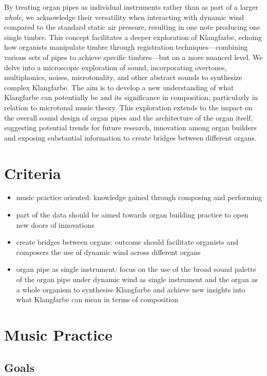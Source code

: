 By treating organ pipes as individual instruments rather than as part of a larger \textit{whole}, we acknowledge their versatility when interacting with dynamic wind compared to the standard static air pressure, resulting in one note producing one single timbre. This concept facilitates a deeper exploration of Klangfarbe, echoing how organists manipulate timbre through registration techniques—combining various sets of pipes to achieve specific timbres—but on a more nuanced level. We delve into a microscopic exploration of sound, incorporating overtones, multiphonics, noises, microtonality, and other abstract sounds to synthesize complex Klangfarbe. The aim is to develop a new understanding of what Klangfarbe can potentially be and its significance in composition, particularly in relation to microtonal music theory. This exploration extends to the impact on the overall sound design of organ pipes and the architecture of the organ itself, suggesting potential trends for future research, innovation among organ builders and exposing substantial information to create bridges between different organs. 

\section{Criteria}

\begin{itemize}
\item music practice oriented: knowledge gained through composing and performing 
\item part of the data should be aimed towards organ building practice to open new doors of innovations
\item create bridges between organs: outcome should facilitate organists and composers the use of dynamic wind across different organs
\item organ pipe as single instrument: focus on the use of the broad sound palette of the organ pipe under dynamic wind as single instrument and the organ as a whole organism to synthesise Klangfarbe and achieve new insights into what Klangfarbe can mean in terms of composition
\end{itemize}

\section{Music Practice}

\subsection{Goals}


